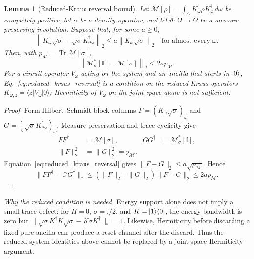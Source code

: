 \documentclass[aps,floatfix,10pt,amssymb,amsfont,amsmath,superscriptaddress,float,nofootinbib,longbibliography,nobalancelastpage,twocolumn]{revtex4-2}
\newtheorem{lemma}{Lemma}
\begin{document}
\begin{lemma}[Reduced-Kraus reversal bound]
\label{lemma:reduced_kraus_reversal}
Let $\mathcal M[\rho]=\int_\Omega K_\omega\rho K_\omega^\dagger\,d\omega$
be completely positive, let $\sigma$ be a density operator, and let
$\vartheta:\Omega\to\Omega$ be a measure-preserving involution.  Suppose
that, for some $a\geq0$,
\begin{equation}
 \left\|K_\omega\sqrt\sigma-\sqrt\sigma K_{\vartheta\omega}^\dagger\right\|_2
 \leq a\left\|K_\omega\sqrt\sigma\right\|_2
 \quad\text{for almost every }\omega .
 \label{eq:reduced_kraus_reversal}
\end{equation}
Then, with $p_{\mathcal M}=\operatorname{Tr}\mathcal M[\sigma]$,
\begin{equation}
 \left\|\mathcal M_\sigma^*[\mathbb I]-\mathcal M[\sigma]\right\|_*
 \leq2a p_{\mathcal M}.
 \label{eq:reversal_defect}
\end{equation}
For a circuit operator $V_\omega$ acting on the system and an ancilla that
starts in $\ket0$, Eq.~\eqref{eq:reduced_kraus_reversal} is a condition on
the \emph{reduced} Kraus operators
$K_{\omega,z}=\langle z|V_\omega|0\rangle$; Hermiticity of $V_\omega$ on the
joint space alone is not sufficient.
\end{lemma}
\begin{proof}
Form Hilbert--Schmidt block columns $F=(K_\omega\sqrt\sigma)_\omega$ and
$G=(\sqrt\sigma K_{\vartheta\omega}^\dagger)_\omega$.  Measure preservation
and trace cyclicity give
\begin{align*}
 FF^\dagger&=\mathcal M[\sigma],&
 GG^\dagger&=\mathcal M_\sigma^*[\mathbb I],\\
 \|F\|_2^2&=\|G\|_2^2=p_{\mathcal M}.&&
\end{align*}
Equation~\eqref{eq:reduced_kraus_reversal} gives
$\|F-G\|_2\leq a\sqrt{p_{\mathcal M}}$.  Hence
\begin{equation*}
 \|FF^\dagger-GG^\dagger\|_*
 \leq(\|F\|_2+\|G\|_2)\|F-G\|_2
 \leq2a p_{\mathcal M}.
\end{equation*}
\end{proof}
\emph{Why the reduced condition is needed.}
Energy support alone does not imply a small trace defect: for
$H=0$, $\sigma=\mathbb I/2$, and $K=\ket1\!\bra0$, the energy bandwidth is
zero but
$\|\sqrt\sigma K^\dagger K\sqrt\sigma-K\sigma K^\dagger\|_*=1$.
Likewise, Hermiticity before discarding a fixed pure ancilla can produce a
reset channel after the discard.  Thus the reduced-system identities above
cannot be replaced by a joint-space Hermiticity argument.
\end{document}
